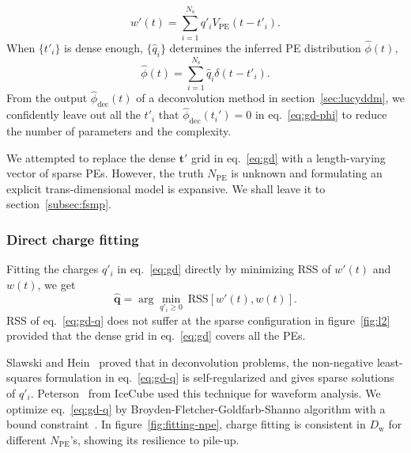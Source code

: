 \begin{equation}
  \label{eq:gd}
  w'(t) = \sum_{i=1}^{N_\mathrm{s}}q'_iV_\mathrm{PE}(t-t'_i).
\end{equation}
When $\{t'_i\}$ is dense enough, $\{\hat{q}_i\}$ determines the inferred PE distribution $\hat{\phi}(t)$,
\begin{equation}
  \label{eq:gd-phi}
  \hat{\phi}(t) = \sum_{i=1}^{N_\mathrm{s}}\hat{q}_i\delta(t-t'_i).
\end{equation}
From the output $\hat{\phi}_\mathrm{dec}(t)$ of a deconvolution method in section~\ref{sec:lucyddm}, we confidently leave out all the $t'_i$ that $\hat{\phi}_\mathrm{dec}(t_i')=0$ in eq.~\eqref{eq:gd-phi} to reduce the number of parameters and the complexity.


We attempted to replace the dense $\bm{t'}$ grid in eq.~\eqref{eq:gd} with a length-varying vector of sparse PEs. However, the truth $N_\mathrm{PE}$ is unknown and formulating an explicit trans-dimensional model is expansive.  We shall leave it to section~\ref{subsec:fsmp}.

\subsubsection{Direct charge fitting}
\label{sec:dcf}

Fitting the charges $q'_i$ in eq.~\eqref{eq:gd} directly by minimizing RSS of $w'(t)$ and $w(t)$, we get
\begin{equation}
  \label{eq:gd-q}
  \bm{\hat{q}} = \arg \underset{q'_i \ge 0}{\min}~\mathrm{RSS}\left[w'(t),w(t)\right].
\end{equation}
RSS of eq.~\eqref{eq:gd-q} does not suffer at the sparse configuration in figure~\ref{fig:l2} provided that the dense grid in eq.~\eqref{eq:gd} covers all the PEs.

Slawski and Hein~\cite{slawski_non-negative_2013} proved that in deconvolution problems, the non-negative least-squares formulation in eq.~\eqref{eq:gd-q} is self-regularized and gives sparse solutions of $q'_i$.  Peterson~\cite{peterson_developments_2021} from IceCube used this technique for waveform analysis.  We optimize eq.~\eqref{eq:gd-q} by Broyden-Fletcher-\allowbreak{}Goldfarb-Shanno algorithm with a bound constraint~\cite{byrd_limited_1995}.  In figure~\ref{fig:fitting-npe}, charge fitting is consistent in $D_\mathrm{w}$ for different $N_\mathrm{PE}$'s, showing its resilience to pile-up.

